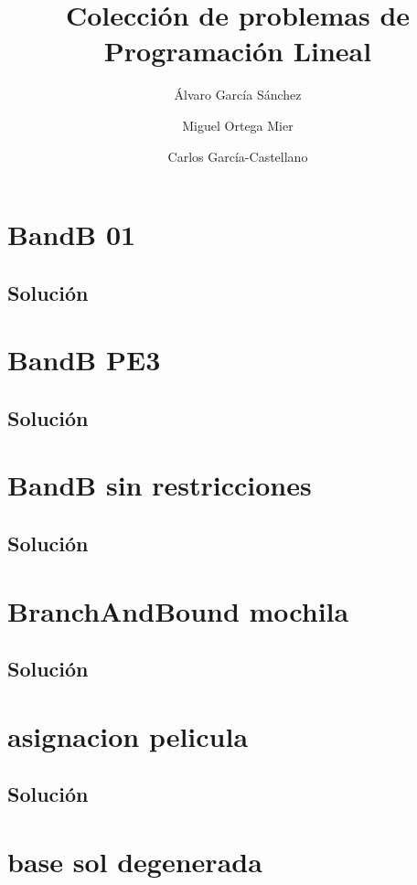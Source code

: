 \documentclass[a4paper,10pt,onecolumn]{report}
\title{Colección de problemas de Programación Lineal}
\author{Álvaro García Sánchez \and Miguel Ortega Mier \and Carlos García-Castellano}
\date{}
\begin{document}
\maketitle
\tableofcontents
\clearpage

\section{BandB 01}

\subsection*{Solución}

\clearpage
\section{BandB PE3}

\subsection*{Solución}

\clearpage
\section{BandB sin restricciones}

\subsection*{Solución}

\clearpage
\section{BranchAndBound mochila}

\subsection*{Solución}

\clearpage
\section{asignacion pelicula}

\subsection*{Solución}

\clearpage
\section{base sol degenerada}

\end{document}
